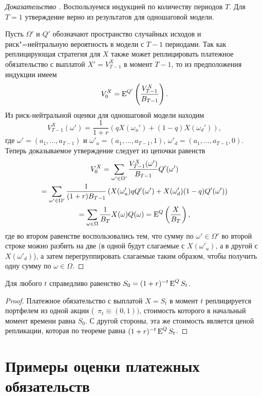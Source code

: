 \begin{proof}[Доказательство \difficult]
Воспользуемся индукцией по количеству периодов $T$.
Для $T=1$ утверждение верно из результатов для одношаговой модели. 

Пусть $\Omega'$ и $Q'$ обозначают пространство случайных исходов и риск"=нейтральную вероятность в модели с $T-1$ периодами. 
Так как реплицирующая стратегия для $X$ также может реплицировать платежное обязательство с выплатой $X'=V_{T-1}^X$ в момент $T-1$, то из предположения индукции имеем
\[
V_0^X = \operatorname{E}^{Q'}\left(\frac{V_{T-1}^X}{B_{T-1}}\right).
\]
Из риск-нейтральной оценки для одношаговой модели находим
\[
V_{T-1}^X(\omega') = \frac{1}{1+r}(q X(\omega_u') + (1-q) X(\omega_d')),
\]
где $\omega' = (a_1,\ldots,a_{T-1})$ и $\omega'_u = (a_1,\ldots,a_{T-1},1)$, $\omega'_d = (a_1,\ldots,a_{T-1},0)$.
Теперь доказываемое утверждение следует из цепочки равенств
\begin{multline*}
V_0^X = \sum_{\omega'\in\Omega'} 
  \frac{V_{T-1}^X(\omega')}{{B_{T-1}}} Q'(\omega') \\
= \sum_{\omega'\in\Omega'} \frac{1}{(1+r)B_{T-1}}
  \left(X(\omega'_u) q Q'(\omega') + X(\omega'_d) (1-q) Q'(\omega')\right) \\
=  \sum_{\omega\in\Omega} \frac{1}{B_T} X(\omega) Q(\omega) 
= \operatorname{E}^Q\left(\frac{X}{B_T}\right),
\end{multline*}
где во втором равенстве воспользовались тем, что сумму по $\omega'\in \Omega'$ во второй строке можно разбить на две (в одной будут слагаемые с $X(\omega'_u)$, а в другой с $X(\omega'_d)$), а затем перегруппировать слагаемые таким образом, чтобы получить одну сумму по $\omega\in\Omega$.
\end{proof}

\begin{corollary}
\label{crr:martingale}
Для любого $t$ справедливо равенство $S_0 = (1+r)^{-t}\operatorname{E}^Q S_t$.
\end{corollary}
\begin{proof}
Платежное обязательство с выплатой $X=S_t$ в момент $t$ реплицируется портфелем из одной акции (\te\ $\pi_t\equiv(0,1))$, стоимость которого в начальный момент времени равна $S_0$.
С другой стороны, эта же стоимость является ценой репликации, которая по теореме равна $(1+r)^{-t}\operatorname{E}^Q S_t$.
\end{proof}


\section{Примеры оценки платежных обязательств}

